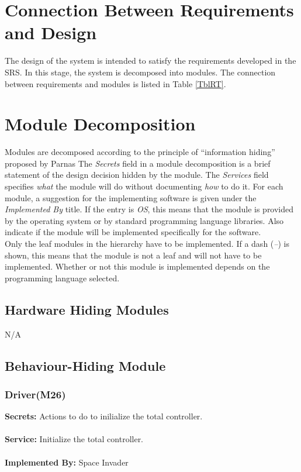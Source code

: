 \documentclass[12pt]{article}
\begin{document}
\section{Connection Between Requirements and Design} \label{SecConnection}

The design of the system is intended to satisfy the requirements developed in
the SRS. In this stage, the system is decomposed into modules. The connection
between requirements and modules is listed in Table \ref{TblRT}.

\section{Module Decomposition} \label{SecMD}

Modules are decomposed according to the principle of ``information hiding''
proposed by Parnas The \emph{Secrets} field in a module
decomposition is a brief statement of the design decision hidden by the
module. The \emph{Services} field specifies \emph{what} the module will do
without documenting \emph{how} to do it. For each module, a suggestion for the
implementing software is given under the \emph{Implemented By} title. If the
entry is \emph{OS}, this means that the module is provided by the operating
system or by standard programming language libraries.  Also indicate if the
module will be implemented specifically for the software.
\\
\noindent 
Only the leaf modules in the
hierarchy have to be implemented. If a dash (\emph{--}) is shown, this means
that the module is not a leaf and will not have to be implemented. Whether or
not this module is implemented depends on the programming language
selected.

\subsection{Hardware Hiding Modules}

N/A

\subsection{Behaviour-Hiding Module}

\subsubsection{Driver(M26)}
\textbf{Secrets:} Actions to do to inilialize the total controller.\\\\
\textbf{Service:} Initialize the total controller.\\\\
\textbf{Implemented By:} Space Invader
\end{document}
